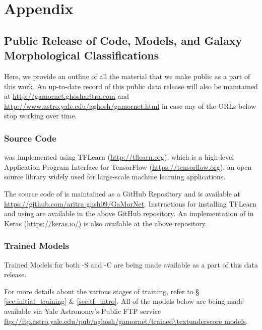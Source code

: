 
\chapter*{Appendix}\label{ch:gamornet_appendix}

\section{Public Release of Code, Models, and Galaxy Morphological Classifications}\label{sec:ap:public_data_release}

Here, we provide an outline of all the material that we make public as a part of this work. An up-to-date record of this public data release will also be maintained at \href{http://gamornet.ghosharitra.com}{http://gamornet.ghosharitra.com} and \href{http://www.astro.yale.edu/aghosh/gamornet.html}{http://www.astro.yale.edu/aghosh/gamornet.html} in case any of the URLs below stop working over time.   

\subsection{\gamornet{} Source Code}\label{sec:ap:gamornet_source_code}

\gamornet{} was implemented using TFLearn\,\,(\href{http://tflearn.org}{http://tflearn.org}), which is a high-level Application Program Interface for TensorFlow\,\,(\href{https://tensorflow.org}{https://tensorflow.org}), an open source library widely used for large-scale machine learning applications.

The source code of \gamornet{} is maintained as a GitHub Repository and is available at \href{https://github.com/aritraghsh09/GaMorNet}{https://github.com/aritra ghsh09/GaMorNet}. Instructions for installing TFLearn and using \gamornet{} are available in the above GitHub repository. An implementation of \gamornet{} in Keras (\href{https://keras.io/}{https://keras.io/}) is also available at the above repository. 

\subsection{\gamornet{} Trained Models }\label{sec:ap:gamornet_trained_models}

Trained Models for both \gamornet{}-S and -C are being made available as a part of this data release. 

For more details about the various stages of training, refer to \S\,\ref{sec:initial_training} \& \ref{sec:tf_intro}. All of the models below are being made available via Yale Astronomy's Public FTP service \href{ftp://ftp.astro.yale.edu/pub/aghosh/gamornet/trained_models}{\url{ftp://ftp.astro.yale.edu/pub/aghosh/gamornet/trained\textunderscore models}}. 

